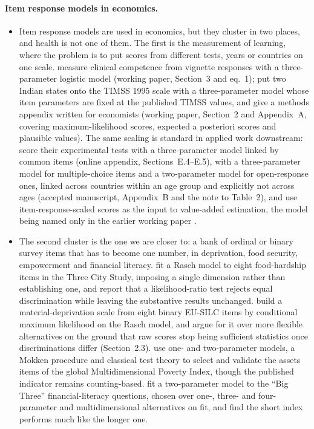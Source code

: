 \documentclass[11pt]{article}
\begin{document}
\paragraph{Item response models in economics.}
\begin{itemize}
\item Item response models are used in economics, but they cluster in two places, and health is not one of them. The first is the measurement of learning, where the problem is to put scores from different tests, years or countries on one scale. \citet{dashammer2005} measure clinical competence from vignette responses with a three-parameter logistic model (working paper, Section~3 and eq.~1); \citet{daszajonc2010} put two Indian states onto the TIMSS 1995 scale with a three-parameter model whose item parameters are fixed at the published TIMSS values, and give a methods appendix written for economists (working paper, Section~2 and Appendix~A, covering maximum-likelihood scores, expected a posteriori scores and plausible values). The same scaling is standard in applied work downstream: \citet{muralidharan2019} score their experimental tests with a three-parameter model linked by common items (online appendix, Sections~E.4--E.5), \citet{singh2020} with a three-parameter model for multiple-choice items and a two-parameter model for open-response ones, linked across countries within an age group and explicitly not across ages (accepted manuscript, Appendix~B and the note to Table~2), and \citet{andrabi2011} use item-response-scaled scores as the input to value-added estimation, the model being named only in the earlier working paper \citep[footnote~14]{andrabi2008}.
\item The second cluster is the one we are closer to: a bank of ordinal or binary survey items that has to become one number, in deprivation, food security, empowerment and financial literacy. \citet{moffitt2016} fit a Rasch model to eight food-hardship items in the Three City Study, imposing a single dimension rather than establishing one, and report that a likelihood-ratio test rejects equal discrimination while leaving the substantive results unchanged. \citet{farcomeni2025} build a material-deprivation scale from eight binary EU-SILC items by conditional maximum likelihood on the Rasch model, and argue for it over more flexible alternatives on the ground that raw scores stop being sufficient statistics once discriminations differ (Section~2.3). \citet{vollmer2022} use one- and two-parameter models, a Mokken procedure and classical test theory to select and validate the assets items of the global Multidimensional Poverty Index, though the published indicator remains counting-based. \citet{kaiser2026} fit a two-parameter model to the ``Big Three'' financial-literacy questions, chosen over one-, three- and four-parameter and multidimensional alternatives on fit, and find the short index performs much like the longer one.

\end{itemize}
\end{document}
